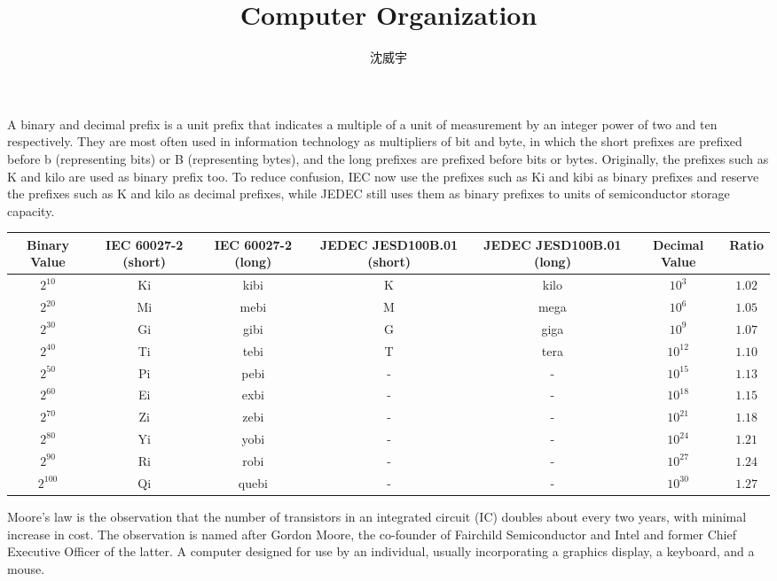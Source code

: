 \documentclass[a4paper,12pt]{report}
\begin{document}
\title{Computer Organization}
\author{沈威宇}
\date{\temtoday}
\titletocdoc
{}
A binary and decimal prefix is a unit prefix that indicates a multiple of a unit of measurement by an integer power of two and ten respectively. They are most often used in information technology as multipliers of bit and byte, in which the short prefixes are prefixed before b (representing bits) or B (representing bytes), and the long prefixes are prefixed before bits or bytes. Originally, the prefixes such as K and kilo are used as binary prefix too. To reduce confusion, IEC now use the prefixes
such as Ki and kibi as binary prefixes and reserve the prefixes such as K and kilo as decimal prefixes, while JEDEC still uses them as binary prefixes to units of semiconductor storage capacity.
\begin{longtable}[c]{|c|c|c|c|c|c|c|}
\hline
Binary Value & IEC 60027-2 (short) & IEC 60027-2 (long) & JEDEC JESD100B.01 (short) & JEDEC JESD100B.01 (long) & Decimal Value & Ratio \\\hline\endhead
$2^{10}$ & Ki & kibi & K & kilo & $10^3$ & $1.02$ \\\hline
$2^{20}$ & Mi & mebi & M & mega & $10^6$ & $1.05$ \\\hline
$2^{30}$ & Gi & gibi & G & giga & $10^9$ & $1.07$ \\\hline
$2^{40}$ & Ti & tebi & T & tera & $10^{12}$ & $1.10$ \\\hline
$2^{50}$ & Pi & pebi & - & - & $10^{15}$ & $1.13$ \\\hline
$2^{60}$ & Ei & exbi & - & - & $10^{18}$ & $1.15$ \\\hline
$2^{70}$ & Zi & zebi & - & - & $10^{21}$ & $1.18$ \\\hline
$2^{80}$ & Yi & yobi & - & - & $10^{24}$ & $1.21$ \\\hline
$2^{90}$ & Ri & robi & - & - & $10^{27}$ & $1.24$ \\\hline
$2^{100}$ & Qi & quebi & - & - & $10^{30}$ & $1.27$ \\\hline
\end{longtable}\FB
{}
Moore's law is the observation that the number of transistors in an integrated circuit (IC) doubles about every two years, with minimal increase in cost. The observation is named after Gordon Moore, the co-founder of Fairchild Semiconductor and Intel and former Chief Executive Officer of the latter.
A computer designed for use by an individual, usually incorporating a graphics display, a keyboard, and a mouse.
\end{document}
